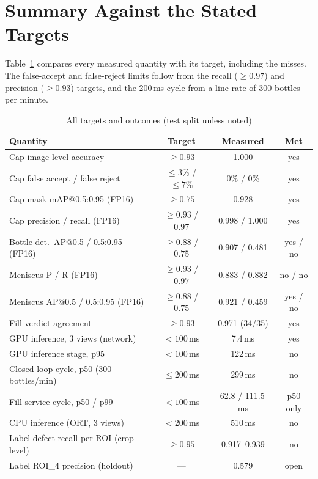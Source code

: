 \section{Summary Against the Stated Targets}
\label{sec:targets}
Table~\ref{tab:targets} compares every measured quantity with its target, including the misses. The false-accept and false-reject limits follow from the recall ($\geq0.97$) and precision ($\geq0.93$) targets, and the 200\,ms cycle from a line rate of 300 bottles per minute.

\begin{table}[htbp]
\centering
\caption{All targets and outcomes (test split unless noted)}
\label{tab:targets}
\footnotesize
\begin{tabular}{|l|c|c|c|}
\hline
\textbf{Quantity} & \textbf{Target} & \textbf{Measured} & \textbf{Met} \\ \hline
Cap image-level accuracy & $\geq0.93$ & 1.000 & yes \\ \hline
Cap false accept / false reject & $\leq3\%$ / $\leq7\%$ & 0\% / 0\% & yes \\ \hline
Cap mask mAP@0.5:0.95 (FP16) & $\geq0.75$ & 0.928 & yes \\ \hline
Cap precision / recall (FP16) & $\geq0.93$ / $0.97$ & 0.998 / 1.000 & yes \\ \hline
Bottle det.\ AP@0.5 / 0.5:0.95 (FP16) & $\geq0.88$ / $0.75$ & 0.907 / 0.481 & yes / no \\ \hline
Meniscus P / R (FP16) & $\geq0.93$ / $0.97$ & 0.883 / 0.882 & no / no \\ \hline
Meniscus AP@0.5 / 0.5:0.95 (FP16) & $\geq0.88$ / $0.75$ & 0.921 / 0.459 & yes / no \\ \hline
Fill verdict agreement & $\geq0.93$ & 0.971 (34/35) & yes \\ \hline
GPU inference, 3 views (network) & $<100$\,ms & 7.4\,ms & yes \\ \hline
GPU inference stage, p95 & $<100$\,ms & 122\,ms & no \\ \hline
Closed-loop cycle, p50 (300 bottles/min) & $\leq200$\,ms & 299\,ms & no \\ \hline
Fill service cycle, p50 / p99 & $<100$\,ms & 62.8 / 111.5\,ms & p50 only \\ \hline
CPU inference (ORT, 3 views) & $<200$\,ms & 510\,ms & no \\ \hline
Label defect recall per ROI (crop level) & $\geq0.95$ & 0.917--0.939 & no \\ \hline
Label ROI\_4 precision (holdout) & --- & 0.579 & open \\ \hline
\end{tabular}
\end{table}

